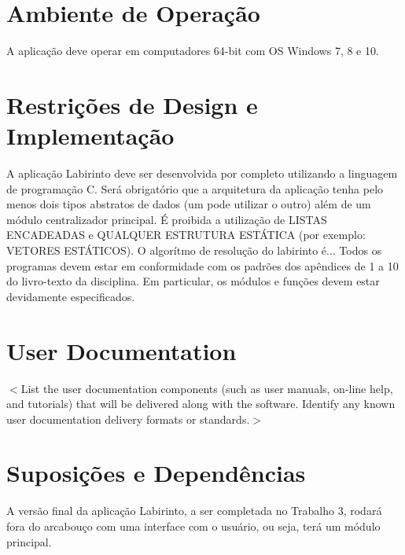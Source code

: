 \section{Ambiente de Operação}
A aplicação deve operar em computadores 64-bit com OS Windows 7, 8 e 10.

\section{Restrições de Design e Implementação}
A aplicação Labirinto deve ser desenvolvida por completo utilizando a linguagem de programação C. Será obrigatório que a arquitetura da aplicação tenha pelo menos dois tipos abstratos de dados (um pode utilizar o outro) além de um módulo centralizador principal. É proibida a utilização de LISTAS
ENCADEADAS e QUALQUER ESTRUTURA ESTÁTICA (por exemplo: VETORES ESTÁTICOS). O algorítmo de resolução do labirinto é... Todos os programas devem estar em conformidade com os padrões dos apêndices de 1 a 10 do livro-texto da disciplina. Em particular, os módulos e funções devem estar devidamente especificados.

\section{User Documentation}
$<$List the user documentation components (such as user manuals, on-line help,
and tutorials) that will be delivered along with the software. Identify any
known user documentation delivery formats or standards.$>$

\section{Suposições e Dependências}
A versão final da aplicação Labirinto, a ser completada no Trabalho 3, rodará fora do arcabouço
com uma interface com o usuário, ou seja, terá um módulo principal.

